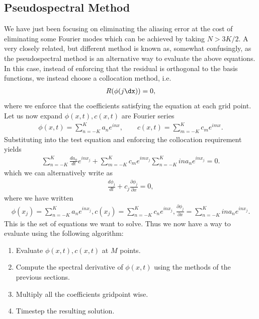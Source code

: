 \subsection{Pseudospectral Method}
We have just been focusing on eliminating the aliasing error at the cost of eliminating some Fourier modes which can be achieved by taking $N>3K/2$. A very closely related, but different method is known as, somewhat confusingly, as the pseudospectral method is an alternative way to evaluate the above equations. In this case, instead of enforcing that the residual is orthogonal to the basis functions, we instead choose a collocation method, i.e.
\begin{align}
R(\phi(j\dx)) = 0,
\end{align}
where we enforce that the coefficients satisfying the equation at each grid point. Let us now expand $\phi(x,t),c(x,t)$ are Fourier series
\begin{align}
\phi(x,t) = \sum_{n=-K}^{K}a_{n}e^{inx}, \qquad c(x,t) = \sum_{m=-K}^{K}c_{m}e^{imx}.
\end{align}
Substituting into the test equation and enforcing the collocation requirement yields
\begin{align}
\sum_{n=-K}^{K}\frac{da_{n}}{dt}e^{inx_{j}} + \sum_{m=-K}^{K}c_{m}e^{imx_{j}}\sum_{n=-K}^{K}ina_{n}e^{inx_{j}}=0.
\end{align} 
which we can alternatively write as
\begin{align}
\frac{d\phi_{j}}{dt} + c_{j}\frac{\partial \phi_{j}}{\partial x} = 0,
\end{align}
where we have written
\begin{align}
\phi(x_{j}) = \sum_{n=-K}^{K}a_{n}e^{inx_{j}}, c(x_{j}) = \sum_{n=-K}^{K}c_{n}e^{inx_{j}}, \frac{\partial\phi_{j}}{\partial x} = \sum_{n=-K}^{K}ina_{n}e^{inx_{j}}.
\end{align}
This is the set of equations we want to solve. Thus we now have a way to evaluate using the following algorithm:
\begin{enumerate}
\item Evaluate $\phi(x,t),c(x,t)$ at $M$ points.
\item Compute the spectral derivative of $\phi(x,t)$ using the methods of the previous sections.
\item Multiply all the coefficients gridpoint wise.
\item Timestep the resulting solution.
\end{enumerate} 

